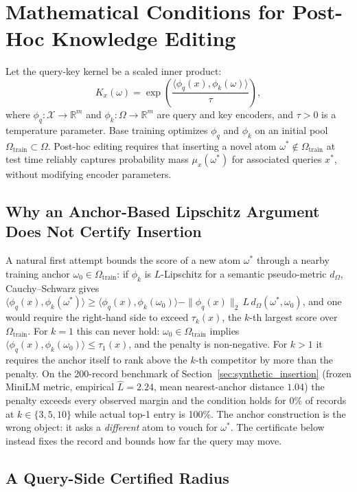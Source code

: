 \documentclass[preprint,12pt]{elsarticle}
\newcommand{\R}{\mathbb{R}}
\newcommand{\Om}{\Omega}
\newif\ifmarkchanges
\newcommand{\rev}[1]{\ifmarkchanges{\color{blue}#1}\else#1\fi}
\begin{document}
\section{Mathematical Conditions for Post-Hoc Knowledge Editing}
\label{sec:editing}

Let the query-key kernel be a scaled inner product:
\[
  K_x(\omega) = \exp\left( \frac{\langle \phi_q(x), \phi_k(\omega) \rangle}{\tau} \right),
\]
where $\phi_q : \mathcal X \to \R^m$ and $\phi_k : \Om \to \R^m$ are query and key encoders, and $\tau > 0$ is a temperature parameter. Base training optimizes $\phi_q$ and $\phi_k$ on an initial pool $\Om_{\mathrm{train}} \subset \Om$. Post-hoc editing requires that inserting a novel atom $\omega^* \notin \Om_{\mathrm{train}}$ at test time reliably captures probability mass $\mu_x(\omega^*)$ for associated queries $x^*$, without modifying encoder parameters.

\subsection{Why an Anchor-Based Lipschitz Argument Does Not Certify Insertion}
\label{sec:anchor_remark}

\rev{A natural first attempt bounds the score of a new atom $\omega^*$ through a nearby training anchor $\omega_0\in\Om_{\mathrm{train}}$: if $\phi_k$ is $L$-Lipschitz for a semantic pseudo-metric $d_\Om$, Cauchy--Schwarz gives $\langle\phi_q(x),\phi_k(\omega^*)\rangle\ge\langle\phi_q(x),\phi_k(\omega_0)\rangle-\|\phi_q(x)\|_2\,L\,d_\Om(\omega^*,\omega_0)$, and one would require the right-hand side to exceed $\tau_k(x)$, the $k$-th largest score over $\Om_{\mathrm{train}}$. For $k=1$ this can never hold: $\omega_0\in\Om_{\mathrm{train}}$ implies $\langle\phi_q(x),\phi_k(\omega_0)\rangle\le\tau_1(x)$, and the penalty is non-negative. For $k>1$ it requires the anchor itself to rank above the $k$-th competitor by more than the penalty. On the 200-record benchmark of Section~\ref{sec:synthetic_insertion} (frozen MiniLM metric, empirical $\hat L=2.24$, mean nearest-anchor distance $1.04$) the penalty exceeds every observed margin and the condition holds for 0\% of records at $k\in\{3,5,10\}$ while actual top-1 entry is 100\%. The anchor construction is the wrong object: it asks a \emph{different} atom to vouch for $\omega^*$. The certificate below instead fixes the record and bounds how far the query may move.}

\subsection{A Query-Side Certified Radius}
\end{document}

